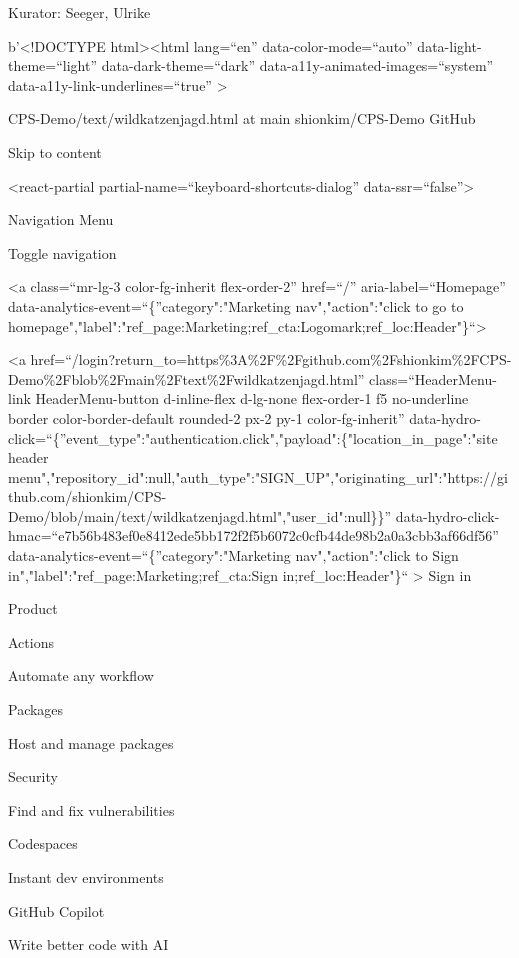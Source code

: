 \documentclass[
  letterpaper,
]{book}
\begin{document}
Kurator: Seeger, Ulrike

b'\textless!DOCTYPE html\textgreater{}\textless html lang=``en''
data-color-mode=``auto'' data-light-theme=``light''
data-dark-theme=``dark'' data-a11y-animated-images=``system''
data-a11y-link-underlines=``true'' \textgreater{}

CPS-Demo/text/wildkatzenjagd.html at main  shionkim/CPS-Demo
 GitHub

Skip to content { {}}

\textless react-partial partial-name=``keyboard-shortcuts-dialog''
data-ssr=``false''\textgreater{}

Navigation Menu

{Toggle navigation}

\textless a class=``mr-lg-3 color-fg-inherit flex-order-2'' href=``/''
aria-label=``Homepage'' data-analytics-event=``\{''category":"Marketing
nav","action":"click to go to
homepage","label":"ref\_page:Marketing;ref\_cta:Logomark;ref\_loc:Header"\}``\textgreater{}

\textless a
href=``/login?return\_to=https\%3A\%2F\%2Fgithub.com\%2Fshionkim\%2FCPS-Demo\%2Fblob\%2Fmain\%2Ftext\%2Fwildkatzenjagd.html''
class=``HeaderMenu-link HeaderMenu-button d-inline-flex d-lg-none
flex-order-1 f5 no-underline border color-border-default rounded-2 px-2
py-1 color-fg-inherit''
data-hydro-click=``\{''event\_type":"authentication.click","payload":\{"location\_in\_page":"site
header
menu","repository\_id":null,"auth\_type":"SIGN\_UP","originating\_url":"https://github.com/shionkim/CPS-Demo/blob/main/text/wildkatzenjagd.html","user\_id":null\}\}''
data-hydro-click-hmac=``e7b56b483ef0e8412ede5bb172f2f5b6072c0cfb44de98b2a0a3cbb3af66df56''
data-analytics-event=``\{''category":"Marketing nav","action":"click to
Sign in","label":"ref\_page:Marketing;ref\_cta:Sign
in;ref\_loc:Header"\}`` \textgreater{} Sign in

Product

Actions

Automate any workflow

Packages

Host and manage packages

Security

Find and fix vulnerabilities

Codespaces

Instant dev environments

GitHub Copilot

Write better code with AI
\end{document}
